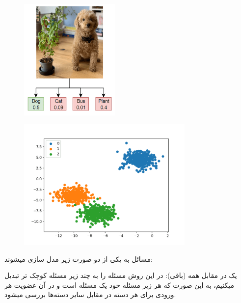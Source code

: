 \documentclass[a4paper, titlepage]{article}
\begin{document}
\begin{figure}[H]
    \center
    \begin{minipage}[b]{0.4\textwidth}
        \center
        \includegraphics[width=\textwidth, height=6cm, width=6cm]{Classification-img3.png}
        \label{Classification-img3}
    \end{minipage}
    \hfill
    \begin{minipage}[b]{0.5\textwidth}
        \center
        \includegraphics[width=\textwidth, height=6.5cm]{Classification-img4.png}
        \label{Classification-img4}
    \end{minipage}
    \caption{}
\end{figure}

\clearpage
مسائل  به یکی از دو صورت زیر مدل سازی میشوند:

یک در مقابل همه (باقی): در این روش مسئله را به چند زیر مسئله کوچک تر تبدیل میکنیم، به این صورت که هر زیر مسئله خود یک مسئله  است و در آن عضویت هر ورودی برای هر دسته در مقابل سایر دسته‌ها بررسی میشود.
\end{document}
